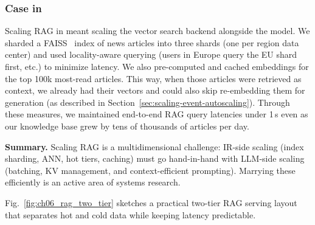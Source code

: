 \subsubsection{Case in \ishtar{}}
Scaling RAG in \ishtar{} meant scaling the vector search backend alongside the model. We sharded a FAISS~\cite{Johnson2019FAISS} index of news articles into three shards (one per region data center) and used locality-aware querying (users in Europe query the EU shard first, etc.) to minimize latency. We also pre-computed and cached embeddings for the top 100k most-read articles. This way, when those articles were retrieved as context, we already had their vectors and could also skip re-embedding them for generation (as described in Section~\ref{sec:scaling-event-autoscaling}). Through these measures, we maintained end-to-end RAG query latencies under 1\,s even as our knowledge base grew by tens of thousands of articles per day.

\medskip
\noindent\textbf{Summary.} Scaling RAG is a multidimensional challenge: IR-side scaling (index sharding, ANN, hot tiers, caching) must go hand-in-hand with LLM-side scaling (batching, KV management, and context-efficient prompting). Marrying these efficiently is an active area of systems research.

Fig.~\ref{fig:ch06_rag_two_tier} sketches a practical two-tier RAG serving layout that separates hot and cold data while keeping latency predictable.

